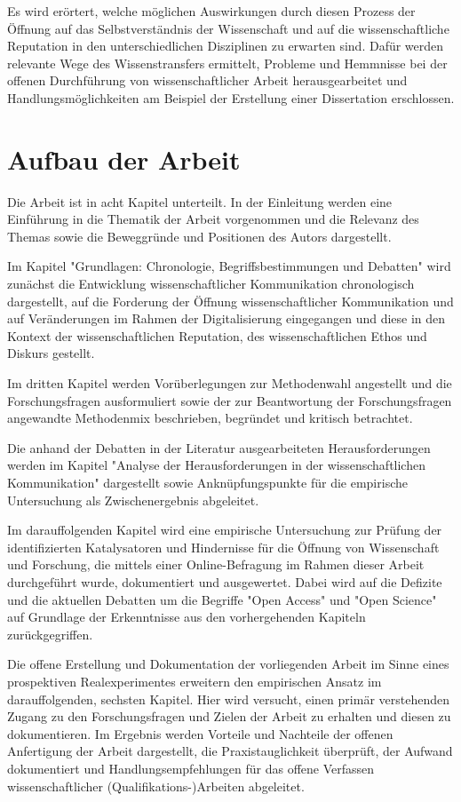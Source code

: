 Es wird erörtert, welche möglichen Auswirkungen durch diesen Prozess der Öffnung auf das Selbstverständnis der Wissenschaft und auf die wissenschaftliche Reputation in den unterschiedlichen Disziplinen zu erwarten sind. Dafür werden relevante Wege des Wissenstransfers ermittelt, Probleme und Hemmnisse bei der offenen Durchführung von wissenschaftlicher Arbeit herausgearbeitet und Handlungsmöglichkeiten am Beispiel der Erstellung einer Dissertation erschlossen.

\section{Aufbau der Arbeit}

Die Arbeit ist in acht Kapitel unterteilt. In der Einleitung werden eine Einführung in die Thematik der Arbeit vorgenommen und die Relevanz des Themas sowie die Beweggründe und Positionen des Autors dargestellt.

Im Kapitel "Grundlagen: Chronologie, Begriffsbestimmungen und Debatten" wird zunächst die Entwicklung wissenschaftlicher Kommunikation chronologisch dargestellt, auf die Forderung der Öffnung wissenschaftlicher Kommunikation und auf Veränderungen im Rahmen der Digitalisierung eingegangen und diese in den Kontext der wissenschaftlichen Reputation, des wissenschaftlichen Ethos und Diskurs gestellt.

Im dritten Kapitel werden Vorüberlegungen zur Methodenwahl angestellt und die Forschungsfragen ausformuliert sowie der zur Beantwortung der Forschungsfragen angewandte Methodenmix beschrieben, begründet und kritisch betrachtet.

Die anhand der Debatten in der Literatur ausgearbeiteten Herausforderungen werden im Kapitel "Analyse der Herausforderungen in der wissenschaftlichen Kommunikation" dargestellt sowie Anknüpfungspunkte für die empirische Untersuchung als Zwischenergebnis abgeleitet.

Im darauffolgenden Kapitel wird eine empirische Untersuchung zur Prüfung der identifizierten Katalysatoren und Hindernisse für die Öffnung von Wissenschaft und Forschung, die mittels einer Online-Befragung im Rahmen dieser Arbeit durchgeführt wurde, dokumentiert und ausgewertet. Dabei wird auf die Defizite und die aktuellen Debatten um die Begriffe "Open Access" und "Open Science" auf Grundlage der Erkenntnisse aus den vorhergehenden Kapiteln zurückgegriffen.

Die offene Erstellung und Dokumentation der vorliegenden Arbeit im Sinne eines prospektiven Realexperimentes erweitern den empirischen Ansatz im darauffolgenden, sechsten Kapitel. Hier wird versucht, einen primär verstehenden Zugang zu den Forschungsfragen und Zielen der Arbeit zu erhalten und diesen zu dokumentieren. Im Ergebnis werden Vorteile und Nachteile der offenen Anfertigung der Arbeit dargestellt, die Praxistauglichkeit überprüft, der Aufwand dokumentiert und Handlungsempfehlungen für das offene Verfassen wissenschaftlicher (Qualifikations-)Arbeiten abgeleitet.

